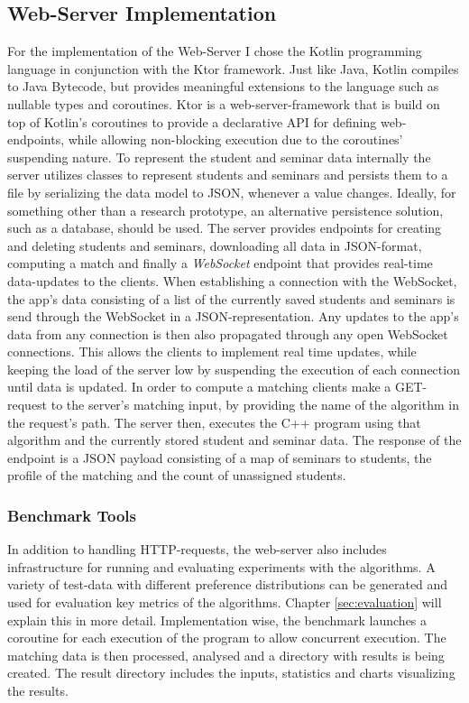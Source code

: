 \subsection{Web-Server Implementation}
For the implementation of the Web-Server I chose the Kotlin programming language in conjunction with the Ktor framework. Just like Java, Kotlin compiles to Java Bytecode, but provides meaningful extensions to the language such as nullable types and coroutines. Ktor is a web-server-framework that is build on top of Kotlin's coroutines to provide a declarative API for defining web-endpoints, while allowing non-blocking execution due to the coroutines' suspending nature. 
To represent the student and seminar data internally the server utilizes classes to represent students and seminars and persists them to a file by serializing the data model to JSON, whenever a value changes. Ideally, for something other than a research prototype, an alternative persistence solution, such as a database, should be used. The server provides endpoints for creating and deleting students and seminars, downloading all data in JSON-format, computing a match and finally a \textit{WebSocket} endpoint that provides real-time data-updates to the clients. When establishing a connection with the WebSocket, the app's data consisting of a list of the currently saved students and seminars is send through the WebSocket in a JSON-representation. Any updates to the app's data from any connection is then also propagated through any open WebSocket connections. This allows the clients to implement real time updates, while keeping the load of the server low by suspending the execution of each connection until data is updated. In order to compute a matching clients make a GET-request to the server's matching input, by providing the name of the algorithm in the request's path. The server then, executes the C++ program using that algorithm and the currently stored student and seminar data. The response of the endpoint is a JSON payload consisting of a map of seminars to students, the profile of the matching and the count of unassigned students.

\subsubsection{Benchmark Tools}
In addition to handling HTTP-requests, the web-server also includes infrastructure for running and evaluating experiments with the algorithms. A variety of test-data with different preference distributions can be generated and used for evaluation key metrics of the algorithms. Chapter \ref{sec:evaluation} will explain this in more detail. Implementation wise, the benchmark launches a coroutine for each execution of the program to allow concurrent execution. The matching data is then processed, analysed and a directory with results is being created. The result directory includes the inputs, statistics and charts visualizing the results.  

